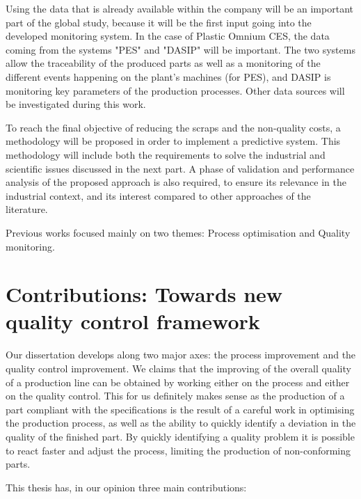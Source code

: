 Using the data that is already available within the company will be an important part of the global study, because it will be the first input going into the developed monitoring system. In the case of Plastic Omnium CES, the data coming from the systems "PES" and "DASIP" will be important. The two systems allow the traceability of the produced parts as well as a monitoring of the different events happening on the plant’s machines (for PES), and DASIP is monitoring key parameters of the production processes. Other data sources will be investigated during this work.

To reach the final objective of reducing the scraps and the non-quality costs, a methodology will be proposed in order to implement a predictive system. This methodology will include both the requirements to solve the industrial and scientific issues discussed in the next part. A phase of validation and performance analysis of the proposed approach is also required, to ensure its relevance in the industrial context, and its interest compared to other approaches of the literature.

Previous works focused mainly on two themes: Process optimisation and Quality monitoring.  


\section{Contributions: Towards new quality control framework}

Our dissertation develops along two major axes: the process improvement and the quality control improvement. We claims that the improving of the overall quality of a production line can be obtained by working either on the process and either on the quality control. This for us definitely makes sense as the production of a part compliant with the specifications is the result of a careful work in optimising the production process, as well as the ability to quickly identify a deviation in the quality of the finished part. By quickly identifying a quality problem it is possible to react faster and adjust the process, limiting the production of non-conforming parts.

This thesis has, in our opinion three main contributions:

